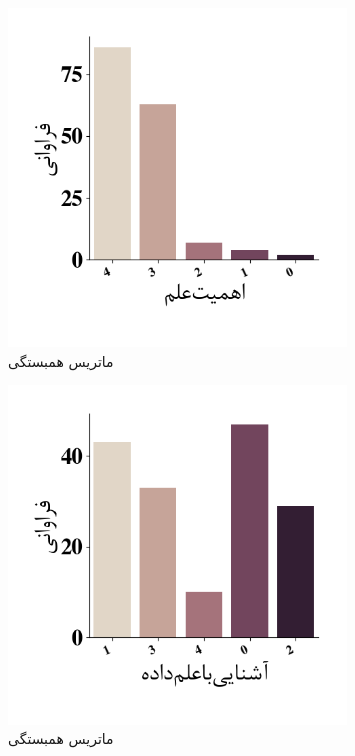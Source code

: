 \begin{figure}[htpb]
    \centering
    \includegraphics[width=0.8\textwidth]{./img/ordinal/ImportanceOfScience.png}
    \caption{ماتریس همبستگی}
    \label{fig:CorrPlotIntervals}
\end{figure}
\begin{figure}[htpb]
    \centering
    \includegraphics[width=0.8\textwidth]{./img/ordinal/DataScieneFamiliarity.png}
    \caption{ماتریس همبستگی}
    \label{fig:CorrPlotIntervals}
\end{figure}

